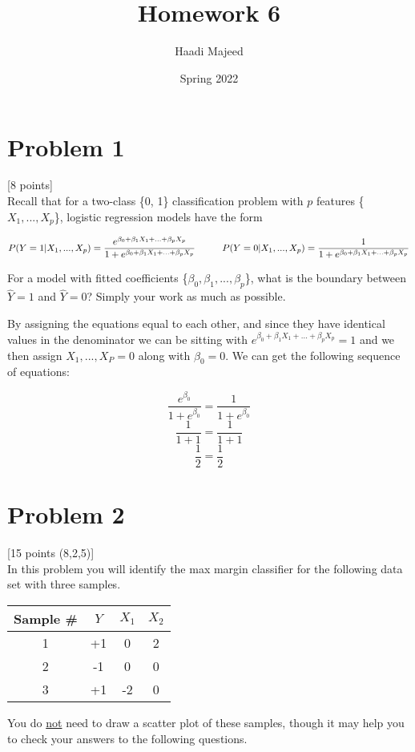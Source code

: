 \documentclass[12pt]{article}
\title{ \course \\\large Homework 6 }
\author{ Haadi Majeed }
\date{Spring 2022}
\newcommand\tab[1][1cm]{\hspace*{#1}}
\begin{document}
\maketitle
\pagebreak

\pagebreak
\section{Problem 1}
 [8 points]\\
Recall that for a two-class \{0, 1\} classification problem with $p$ features \{$X_1, . . . , X_p$\}, logistic regression models have the form
\begin{center}
    \[
        P(Y=1 | X_1, . . . , X_p) = \frac{e^{\beta_0+\beta_1X_1+...+\beta_pX_p}}{1 + e^{\beta_0+\beta_1X_1+...+\beta_pX_p}} \tab P(Y=0 | X_1, . . . , X_p) = \frac{1}{1 + e^{\beta_0+\beta_1X_1+...+\beta_pX_p}}
    \]
\end{center}
For a model with fitted coefficients \{$\beta_0, \beta_1, . . . , \beta_p$\}, what is the boundary between $\hat{Y} = 1$ and $\hat{Y} = 0$? Simply your work as much as possible.


By assigning the equations equal to each other, and since they have identical values in the denominator we can be sitting with $e^{\beta_0+\beta_1X_1+...+\beta_pX_p} = 1$ and we then assign ${X_1, ..., X_P} = 0$ along with $\beta_0 = 0$. We can get the following sequence of equations:
\begin{center}
    \[
        \frac{e^{\beta_0}}{1 + e^{\beta_0}} = \frac{1}{1 + e^{\beta_0}}
    \]
    \[
        \frac{1}{1+1} = \frac{1}{1+1}
    \]
    \[
        \frac{1}{2} = \frac{1}{2}
    \]
\end{center}

\pagebreak
\section{Problem 2}
 [15 points (8,2,5)]\\
In this problem you will identify the max margin classifier for the following data set with three samples.
\begin{center}
    \begin{tabular}{ |c|c|c|c| }
        \hline
        Sample \# & $Y$ & $X_1$ & $X_2$ \\
        \hline
        1         & +1  & 0     & 2     \\
        \hline
        2         & -1  & 0     & 0     \\
        \hline
        3         & +1  & -2    & 0     \\
        \hline
    \end{tabular}
\end{center}
You do \underline{not} need to draw a scatter plot of these samples, though it may help you to check your answers to the following questions.
\end{document}
